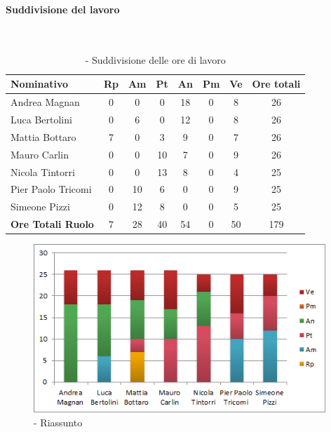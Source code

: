 \documentclass[./PianoDiProgetto.tex]{subfiles}
\begin{document}
	\subsubsection{\PerPA}
				\paragraph{Suddivisione del lavoro}\
						
	\begin{table}[H]
		\centering
	
		\begin{tabularx}{\textwidth}{l  * {6}{c}  c}
			\toprule
			\textbf{Nominativo} & \textbf{Rp} & \textbf{Am} & \textbf{Pt} 
						& \textbf{An} & \textbf{Pm} & \textbf{Ve} & \textbf{Ore totali} \\
			\midrule
			Andrea Magnan  & 0 & 0 & 0 & 18 & 0 & 8 & 26 \\
			Luca Bertolini  & 0 & 6 & 0 & 12 & 0 & 8 & 26 \\
			Mattia Bottaro  & 7 & 0 & 3 & 9 & 0 & 7 & 26 \\
			Mauro Carlin  & 0 & 0 & 10 & 7 & 0 & 9 & 26 \\
			Nicola Tintorri  & 0 & 0 & 13 & 8 & 0 & 4 & 25 \\
			Pier Paolo Tricomi  & 0 & 10 & 6 & 0 & 0 & 9 & 25 \\
			Simeone Pizzi & 0 & 12 & 8 & 0 & 0 & 5 & 25 \\
			\midrule
			\textbf{Ore Totali Ruolo} & 7 & 28 & 40 & 54 & 0 & 50 & 179 \\
			\bottomrule
		\end{tabularx}
		\caption{\PerPA{} - Suddivisione delle ore di lavoro}
	\end{table}
\vfill	
	
	\begin{figure}[H]
		\centering
		\includegraphics[width=11cm, trim=1cm 0cm 1cm 0cm]{grafici/PA-persona}
			\caption{\PerPA{} - Riassunto}
	\end{figure}
\vfill	
\newpage
	
\end{document}
